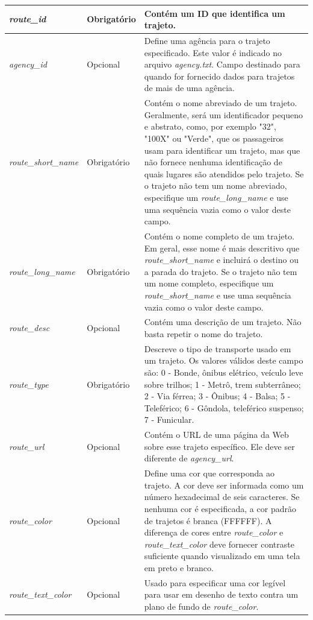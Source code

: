 \documentclass[
	12pt,				%
	oneside,			%
	a4paper,			%
	english,			%
	brazil				%
	]{abntex2ppgsi}
\begin{document}
{{\begin{apendicesenv}
\begin{longtable}[!htb]{>{\centering\arraybackslash}m{3.8cm} | >{\centering}m{2.5cm} | >{\centering\arraybackslash}m{8.5cm}}
\hline
\textit{route\_id} & Obrigatório & Contém um ID que identifica um trajeto. \\
\hline
\textit{agency\_id} & Opcional & Define uma agência para o trajeto especificado. Este valor é indicado no arquivo \textit{agency.txt}. Campo destinado para quando for fornecido dados para trajetos de mais de uma agência. \\
\hline
\textit{route\_short\_name} & Obrigatório & Contém o nome abreviado de um trajeto. Geralmente, será um identificador pequeno e abstrato, como, por exemplo "32", "100X" ou "Verde", que os passageiros usam para identificar um trajeto, mas que não fornece nenhuma identificação de quais lugares são atendidos pelo trajeto. Se o trajeto não tem um nome abreviado, especifique um \textit{route\_long\_name} e use uma sequência vazia como o valor deste campo. \\
\hline
\textit{route\_long\_name} & Obrigatório & Contém o nome completo de um trajeto. Em geral, esse nome é mais descritivo que \textit{route\_short\_name} e incluirá o destino ou a parada do trajeto. Se o trajeto não tem um nome completo, especifique um \textit{route\_short\_name} e use uma sequência vazia como o valor deste campo. \\
\hline
\textit{route\_desc} & Opcional & Contém uma descrição de um trajeto. Não basta repetir o nome do trajeto. \\
\hline
\textit{route\_type} & Obrigatório & Descreve o tipo de transporte usado em um trajeto. Os valores válidos deste campo são:
0 - Bonde, ônibus elétrico, veículo leve sobre trilhos; 1 - Metrô, trem subterrâneo; 2 - Via férrea;  3 - Ônibus; 4 - Balsa; 5 - Teleférico; 6 - Gôndola, teleférico suspenso; 7 - Funicular. \\
\hline
\textit{route\_url} & Opcional & Contém o URL de uma página da Web sobre esse trajeto específico. Ele deve ser diferente de \textit{agency\_url}.\\
\hline
\textit{route\_color} & Opcional & Define uma cor que corresponda ao trajeto. A cor deve ser informada como um número hexadecimal de seis caracteres. Se nenhuma cor é especificada, a cor padrão de trajetos é branca (FFFFFF). A diferença de cores entre \textit{route\_color} e \textit{route\_text\_color} deve fornecer contraste suficiente quando visualizado em uma tela em preto e branco. \\
\hline
\textit{route\_text\_color} & Opcional & Usado para especificar uma cor legível para usar em desenho de texto contra um plano de fundo de \textit{route\_color}. \\
\end{longtable}
\vspace{-\baselineskip}


\end{apendicesenv}}}
\end{document}
